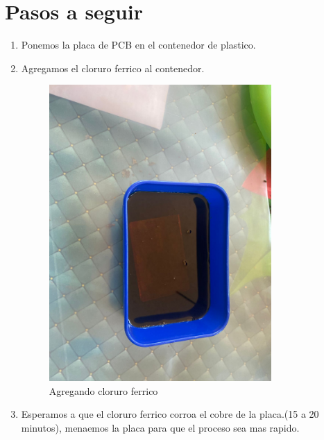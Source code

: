 \documentclass[12pt]{report}
\begin{document}
\section{Pasos a seguir}
\begin{enumerate}
  \item Ponemos la placa de PCB en el contenedor de plastico.

  \item Agregamos el cloruro ferrico al contenedor.
  \begin{figure}[H]
      \centering
      \includegraphics[width=0.8\textwidth]{screenshots/PlacaEnAcido.jpeg}
      \caption{Agregando cloruro ferrico}
      \label{fig:cloruro}
  \end{figure}

  \item Esperamos a que el cloruro ferrico corroa el cobre de la placa.(15 a 20 minutos), menaemos la placa para que el proceso sea mas rapido.


\end{enumerate}
\end{document}
